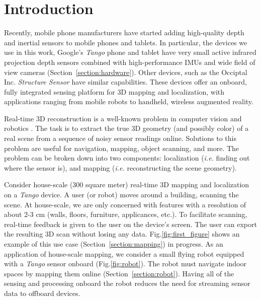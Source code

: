 \documentclass[conference]{IEEEtran}
\newcommand{\sref}[1]{Section~\ref{#1}}
\newcommand{\figref}[1]{Fig.\ref{#1}}
\newcommand{\ie}{\textit{i.e. }}
\newcommand{\Tango}{\textit{Tango} }
\begin{document}
\section{Introduction}
Recently, mobile phone manufacturers have started adding
high-quality depth and  inertial sensors to mobile phones and tablets. In
particular, the devices we use in this work, Google's \Tango \cite{Tango}
phone and tablet have very small active infrared projection depth sensors
combined with high-performance IMUs and wide field of view cameras
(\sref{section:hardware}). Other devices, such as the Occiptal Inc.
\textit{Structure Sensor} \cite{StructureSensor} have similar capabilities.
These devices offer an onboard, fully integrated sensing platform for 3D mapping
and localization, with applications ranging from mobile robots to handheld,
wireless augmented reality. 

Real-time 3D reconstruction is a well-known problem in computer vision and
robotics \cite{Hartley2004}. The task is to extract the true 3D geometry (and
possibly color) of a real scene from a sequence of noisy sensor readings online.
Solutions to this problem are useful for navigation, mapping, object scanning,
and more. The problem can be broken down into two components: localization (\ie finding out
where the sensor is), and mapping (\ie reconstructing the scene geometry). 

Consider house-scale (300 square meter) real-time 3D mapping and localization on
a \Tango device.  A user (or robot) moves around a building, scanning
the scene. At house-scale, we are only concerned with features with a resolution
of about 2-3 cm (walls, floors, furniture, applicances, etc.). To facilitate
scanning, real-time feedback is given to the user on the device's screen.  The
user can export the resulting 3D scan without losing any data.
\figref{fig:first_figure} shows an example of this use case (\sref{section:mapping})
in progress. As an application of house-scale mapping, we consider a small
flying robot equipped with a \Tango sensor onboard (\figref{fig:robot}). The
robot must navigate indoor spaces by mapping them online (\sref{section:robot}).
Having all of the sensing and processing onboard the robot reduces the need for
streaming sensor data to offboard devices.
\end{document}
